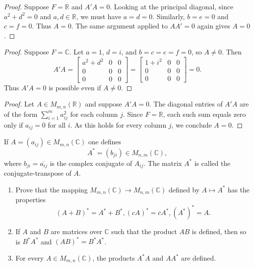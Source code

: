 \begin{proof}
    Suppose $F = \mathbb{R}$ and $A'A = 0$.
    Looking at the principal diagonal, since $a^2 + d^2 = 0$ and $a, d \in \mathbb{R}$,
    we must have $a = d = 0$.
    Similarly, $b = e = 0$ and $c = f = 0$. Thus $A = 0$.
    The same argument applied to $AA' = 0$ again gives $A = 0$.
\end{proof}

\begin{proof}
    Suppose $F = \mathbb{C}$.
    Let $a = 1$, $d = i$, and $b = c = e = f = 0$, so $A \ne 0$. Then
    \[
    A'A = \begin{bmatrix}
        a^2 + d^2 & 0 & 0 \\
        0 & 0 & 0 \\
        0 & 0 & 0
    \end{bmatrix}
    =
    \begin{bmatrix}
        1 + i^2 & 0 & 0 \\
        0 & 0 & 0 \\
        0 & 0 & 0
    \end{bmatrix}
    = 0.
    \]
    Thus $A'A = 0$ is possible even if $A \ne 0$.
\end{proof}

\begin{proof}
    Let $A \in M_{m,n}(\mathbb{R})$ and suppose $A'A = 0$.
    The diagonal entries of $A'A$ are of the form $\sum_{i=1}^{m} a_{ij}^2$ for each column $j$.
    Since $F = \mathbb{R}$, each such sum equals zero only if $a_{ij} = 0$ for all $i$.
    As this holds for every column $j$, we conclude $A = 0$.
\end{proof}


\begin{tcolorbox}[title=Exercise 3, breakable]
    If $A = (a_{ij}) \in M_{m, n}(\mathbb{C})$ one defines 
    \[A^* = (b_{ji}) \in M_{n, m}(\mathbb{C}),\]
    where $b_{ji} = \overline{a_{ij}}$ is the complex conjugate of $A_{ij}$.
    The matrix $A^*$ is called the conjugate-transpose of $A$.
    \begin{enumerate}
        \item Prove that the mapping $M_{m, n}(\mathbb{C}) \longrightarrow M_{n, m}(\mathbb{C})$
            defined by $A \mapsto A^*$ has the properties 
        \[(A + B)^* = A^* + B^*, (cA)^* = \overline{c}A^*, (A^*)^* = A.\]
        \item If $A$ and $B$ are matrices over $\mathbb{C}$ such that the product $AB$ is defined,
        then so is $B^* A^*$ and $(AB)^* = B^* A^*$.
        \item For every $A \in M_{m, n}(\mathbb{C})$, the products $A^* A$ and $A A^*$ are defined.
    \end{enumerate}
\end{tcolorbox}

